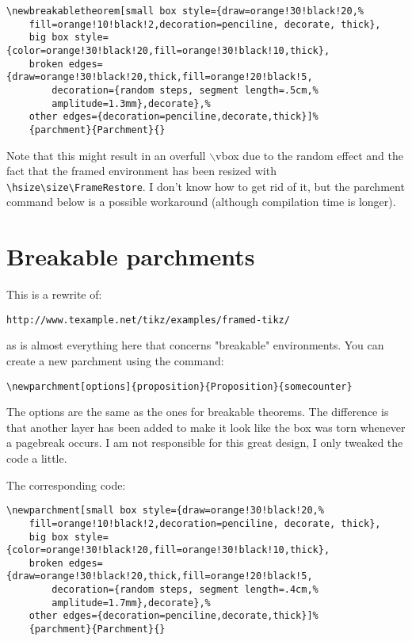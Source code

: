 \documentclass[11pt,oneside]{article}
\begin{document}
\begin{verbatim}
\newbreakabletheorem[small box style={draw=orange!30!black!20,%
    fill=orange!10!black!2,decoration=penciline, decorate, thick},
    big box style={color=orange!30!black!20,fill=orange!30!black!10,thick},
    broken edges={draw=orange!30!black!20,thick,fill=orange!20!black!5, 
        decoration={random steps, segment length=.5cm,%
        amplitude=1.3mm},decorate},%
    other edges={decoration=penciline,decorate,thick}]%
    {parchment}{Parchment}{}
\end{verbatim}


\begin{parchment}
    \lipsum[10-21]
\end{parchment}

Note that this might result in an overfull $\backslash$vbox due to the random
effect and the fact that the framed environment has been
resized with \verb!\hsize\size\FrameRestore!. I don't
know how to get rid of it, but the parchment command below is a possible workaround
(although compilation time is longer).



\section{Breakable parchments}

This is a rewrite of:
\begin{verbatim}
http://www.texample.net/tikz/examples/framed-tikz/
\end{verbatim}

as is almost everything here that concerns "breakable" environments. You can create
a new parchment using the command:

\begin{verbatim}
\newparchment[options]{proposition}{Proposition}{somecounter}
\end{verbatim}

The options are the same as the ones for breakable theorems. The difference
is that another layer has been added to make it look like the box was torn whenever
a pagebreak occurs. I am not responsible for this great design, I only tweaked
the code a little.

\begin{parchmentb}
    \lipsum[10-21]
\end{parchmentb}

The corresponding code:
\begin{verbatim}
\newparchment[small box style={draw=orange!30!black!20,%
    fill=orange!10!black!2,decoration=penciline, decorate, thick},
    big box style={color=orange!30!black!20,fill=orange!30!black!10,thick},
    broken edges={draw=orange!30!black!20,thick,fill=orange!20!black!5, 
        decoration={random steps, segment length=.4cm,%
        amplitude=1.7mm},decorate},%
    other edges={decoration=penciline,decorate,thick}]%
    {parchment}{Parchment}{}      
\end{verbatim}
\end{document}
